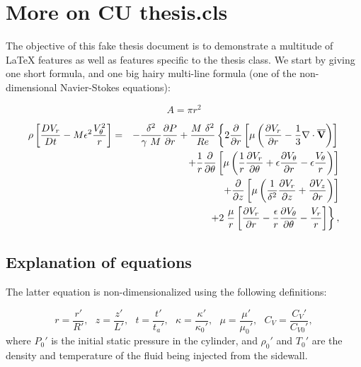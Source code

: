 \chapter{More on CU thesis.cls}
\label{exchap2}

The objective of this fake thesis document is to demonstrate
a multitude of \LaTeX{} features as well as features specific
to the thesis class.
We start by giving one short formula,
and one big hairy multi-line formula
(one of the non-dimensional Navier-Stokes equations):

\begin{equation}
	A = \pi r^2
\end{equation}


\begin{eqnarray}
  \rho \left[ \frac{DV_r}{Dt} - M \epsilon^2
    \frac{V_{\theta}^2}{r} \right]
  & = & -\frac{\delta^2}{\gamma~ M} \frac{\partial P}{\partial r}
	+ \frac{M ~\delta^2}{Re} \left\{ 2 \frac{\partial }{\partial r}
	\left[ \mu \left( \frac{\partial V_r}{\partial r}
        - \frac{1}{3} {\bf \nabla \cdot \overline{V}}
      \right) \right] \right. \nonumber \\
  & & + \frac{1}{r} \frac{\partial }{\partial \theta} \left[ \mu \left(
      \frac{1}{r} \frac{\partial V_r}{\partial \theta} + \epsilon \frac{\partial V_{\theta}}{\partial r}
      - \epsilon \frac{V_{\theta}}{r} \right) \right] \nonumber \\
  & & + \frac{\partial }{\partial z} \left[ \mu \left( \frac{1}{\delta^2}
        \frac{\partial V_r}{\partial z} + \frac{\partial V_z}{\partial r} \right) \right] \nonumber \\
  & & + 2 \left. \frac{\mu}{r}\left[ \frac{\partial V_r}{\partial r} -\frac{\epsilon}{r}
      \frac{\partial V_{\theta}}{\partial \theta} - \frac{V_r}r\right] \right\}, \label{eq:rmom}
\end{eqnarray}


\section{Explanation of equations}

The latter equation is non-dimensionalized using the following definitions:

\[
	r = \frac{r'}{R'}, ~~~
	z = \frac{z'}{L'},~~~
	t = \frac{t'}{t_a'}, ~~~
	\kappa = \frac{\kappa'}{\kappa_0'}, ~~~
	\mu = \frac{\mu'}{\mu_0'} , ~~~
	C_V = \frac{C_V'}{C_{V0}'},
\]
where $P_0'$ is the initial static pressure in the cylinder,
and $\rho_0'$ and $T_0'$ are the density and temperature
of the fluid being injected from the sidewall.


